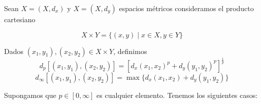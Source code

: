 \begin{eg}
    Sean $X=(X,{d}_{x})$ y $X=(X,{d}_{y})$ espacios métricos consideramos el producto cartesiano
    
    \begin{equation*}
        X \times Y = \{ (x,y) \mid x \in X, y \in Y \}
    \end{equation*}

    Dados $({x}_{1},{y}_{1}), ({x}_{2},{y}_{2}) \in X \times Y$, definimos
    \begin{equation*}
        {d}_{p}[({x}_{1},{y}_{1}), ({x}_{2},{y}_{2})] = {[{d}_{x}{({x}_{1},{x}_{2})}^{p}+{d}_{y}{({y}_{1},{y}_{2})}^{p}]}^{\frac{1}{p}}
    \end{equation*}
    \begin{equation*}
        {d}_{\infty}[({x}_{1},{y}_{1}), ({x}_{2},{y}_{2})] = \max \{ {d}_{x}({x}_{1},{x}_{2})+{d}_{y}({y}_{1},{y}_{2}) \}
    \end{equation*}
\end{eg}

\begin{explanation}
    Supongamos que $p \in [0,\infty]$ es cualquier elemento. Tenemos los siguientes casos:
\end{explanation}

